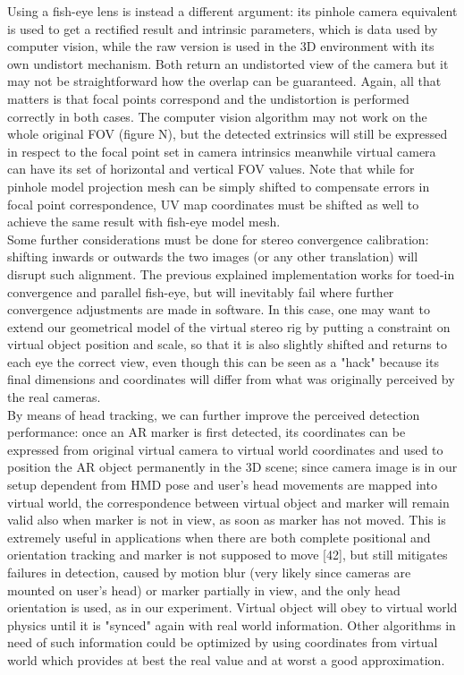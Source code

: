 Using a fish-eye lens is instead a different argument: its pinhole camera equivalent is used to get a rectified result and intrinsic parameters, which is data used by computer vision, while the raw version is used in the 3D environment with its own undistort mechanism. Both return an undistorted view of the camera but it may not be straightforward how the overlap can be guaranteed. Again, all that matters is that focal points correspond and the undistortion is performed correctly in both cases. The computer vision algorithm may not work on the whole original FOV (figure N), but the detected extrinsics will still be expressed in respect to the focal point set in camera intrinsics meanwhile virtual camera can have its set of horizontal and vertical FOV values. Note that while for pinhole model projection mesh can be simply shifted to compensate errors in focal point correspondence, UV map coordinates must be shifted as well to achieve the same result with fish-eye model mesh.\\
Some further considerations must be done for stereo convergence calibration: shifting inwards or outwards the two images (or any other translation) will disrupt such alignment. The previous explained implementation works for toed-in convergence and parallel fish-eye, but will inevitably fail where further convergence adjustments are made in software. In this case, one may want to extend our geometrical model of the virtual stereo rig by putting a constraint on virtual object position and scale, so that it is also slightly shifted and returns to each eye the correct view, even though this can be seen as a "hack" because its final dimensions and coordinates will differ from what was originally perceived by the real cameras.\\
By means of head tracking, we can further improve the perceived detection performance: once an AR marker is first detected, its coordinates can be expressed from original virtual camera to virtual world coordinates and used to position the AR object permanently in the 3D scene; since camera image is in our setup dependent from HMD pose and user's head movements are mapped into virtual world, the correspondence between virtual object and marker will remain valid also when marker is not in view, as soon as marker has not moved. This is extremely useful in applications when there are both complete positional and orientation tracking and marker is not supposed to move [42], but still mitigates failures in detection, caused by motion blur (very likely since cameras are mounted on user's head)  or marker partially in view, and the only head orientation is used, as in our experiment. Virtual object will obey to virtual world physics until it is "synced" again with real world information. Other algorithms in need of such information could be optimized by using coordinates from virtual world which provides at best the real value and at worst a good approximation.


